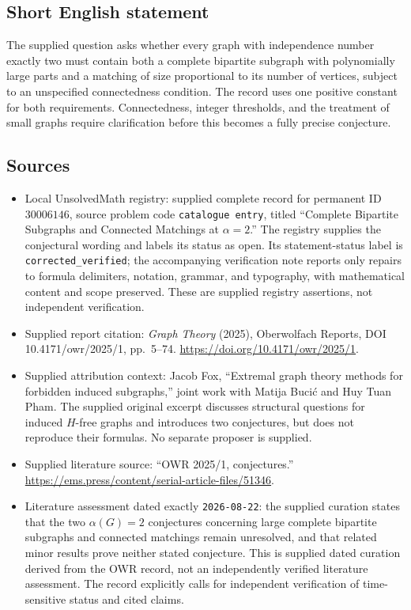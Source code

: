 \documentclass[11pt]{article}
\begin{document}
\subsection{Short English statement}
The supplied question asks whether every graph with independence number exactly two must contain both a complete bipartite subgraph with polynomially large parts and a matching of size proportional to its number of vertices, subject to an unspecified connectedness condition. The record uses one positive constant for both requirements. Connectedness, integer thresholds, and the treatment of small graphs require clarification before this becomes a fully precise conjecture.
\subsection{Sources}
\begin{itemize}
\item Local UnsolvedMath registry: supplied complete record for permanent ID \(30006146\), source problem code \texttt{catalogue entry}, titled ``Complete Bipartite Subgraphs and Connected Matchings at \(\alpha=2\).'' The registry supplies the conjectural wording and labels its status as open. Its statement-status label is \texttt{corrected\_verified}; the accompanying verification note reports only repairs to formula delimiters, notation, grammar, and typography, with mathematical content and scope preserved. These are supplied registry assertions, not independent verification.
\item Supplied report citation: \emph{Graph Theory} (2025), Oberwolfach Reports, DOI 10.4171/owr/2025/1, pp.~5--74. \url{https://doi.org/10.4171/owr/2025/1}.
\item Supplied attribution context: Jacob Fox, ``Extremal graph theory methods for forbidden induced subgraphs,'' joint work with Matija Bucić and Huy Tuan Pham. The supplied original excerpt discusses structural questions for induced \(H\)-free graphs and introduces two conjectures, but does not reproduce their formulas. No separate proposer is supplied.
\item Supplied literature source: ``OWR 2025/1, conjectures.'' \url{https://ems.press/content/serial-article-files/51346}.
\item Literature assessment dated exactly \texttt{2026-08-22}: the supplied curation states that the two \(\alpha(G)=2\) conjectures concerning large complete bipartite subgraphs and connected matchings remain unresolved, and that related minor results prove neither stated conjecture. This is supplied dated curation derived from the OWR record, not an independently verified literature assessment. The record explicitly calls for independent verification of time-sensitive status and cited claims.
\end{itemize}
\end{document}
